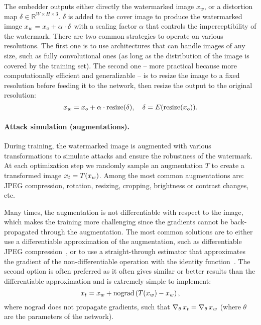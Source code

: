 The embedder outputs either directly the watermarked image $x_w$, or a distortion map $\delta \in \mathbb{R}^{W\times H\times 3}$.
$\delta$ is added to the cover image to produce the watermarked image $x_w = x_o + \alpha \cdot \delta$ with a scaling factor $\alpha$ that controls the imperceptibility of the watermark.
There are two common strategies to operate on various resolutions.
The first one is to use architectures that can handle images of any size, such as fully convolutional ones (as long as the distribution of the image is covered by the training set).
The second  one -- more practical because more computationally efficient and generalizable -- is to resize the image to a fixed resolution before feeding it to the network, then resize the output to the original resolution: 
\begin{equation}
    x_w = x_o + \alpha \cdot \text{resize}(\delta), \quad \delta = E(\text{resize}(x_o)).
\end{equation}


\paragraph*{Attack simulation (augmentations).}
During training, the watermarked image is augmented with various transformations to simulate attacks and ensure the robustness of the watermark.
At each optimization step we randomly sample an augmentation $T$ to create a transformed image $x_t = T(x_w)$.
Among the most common augmentations are: JPEG compression, rotation, resizing, cropping, brightness or contrast changes, etc.

Many times, the augmentation is not differentiable with respect to the image, which makes the training more challenging since the gradients cannot be back-propagated through the augmentation.
The most common solutions are to either use a differentiable approximation of the augmentation, such as differentiable JPEG compression~\citep{zhu2018hidden}, or to use a straight-through estimator that approximates the gradient of the non-differentiable operation with the identity function~\citep{bengio2013estimating}.
The second option is often preferred as it often gives similar or better results than the differentiable approximation and is extremely simple to implement:
\begin{equation}
    x_t = x_w + \mathrm{nograd} \left( T(x_w) - x_w \right),
\end{equation}
where $\mathrm{no grad}$ does not propagate gradients, such that $\nabla_\theta\,x_t = \nabla_\theta\,x_w$ (where $\theta$ are the parameters of the network).



